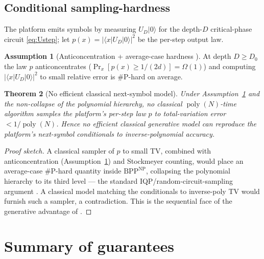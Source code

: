 \documentclass[11pt]{article}
\theoremstyle{plain}
\newtheorem{theorem}{Theorem}[section]
\theoremstyle{definition}
\newtheorem{assumption}[theorem]{Assumption}
\theoremstyle{remark}
\newcommand{\ket}[1]{\lvert #1 \rangle}
\newcommand{\bra}[1]{\langle #1 \rvert}
\DeclareMathOperator{\poly}{poly}
\begin{document}
\subsection{Conditional sampling-hardness}
The platform emits symbols by measuring $U_D\ket0$ for the depth-$D$ critical-phase circuit \eqref{eq:Ustep}; let $p(x)=|\bra x U_D\ket0|^2$ be the per-step output law.
\begin{assumption}[Anticoncentration + average-case hardness \cite{IQP,BFNV}]\label{ass:hard}
At depth $D\ge D_0$ the law $p$ anticoncentrates ($\Pr_x[p(x)\ge 1/(2d)]=\Omega(1)$) and computing $|\bra x U_D\ket0|^2$ to small relative error is $\#\mathrm P$-hard on average.
\end{assumption}
\begin{theorem}[No efficient classical next-symbol model]\label{thm:t5hard}
Under Assumption~\ref{ass:hard} and the non-collapse of the polynomial hierarchy, no classical $\poly(N)$-time algorithm samples the platform's per-step law $p$ to total-variation error $<1/\poly(N)$. Hence no efficient classical generative model can reproduce the platform's next-symbol conditionals to inverse-polynomial accuracy.
\end{theorem}
\begin{proof}[Proof sketch]
A classical sampler of $p$ to small TV, combined with anticoncentration (Assumption~\ref{ass:hard}) and Stockmeyer counting, would place an average-case $\#\mathrm P$-hard quantity inside $\mathrm{BPP}^{\mathrm{NP}}$, collapsing the polynomial hierarchy to its third level --- the standard IQP/random-circuit-sampling argument \cite{IQP,BFNV}. A classical model matching the conditionals to inverse-poly TV would furnish such a sampler, a contradiction. This is the sequential face of the generative advantage of \cite{GenAdv}.\end{proof}

\section{Summary of guarantees}\label{sec:summary}
\end{document}
